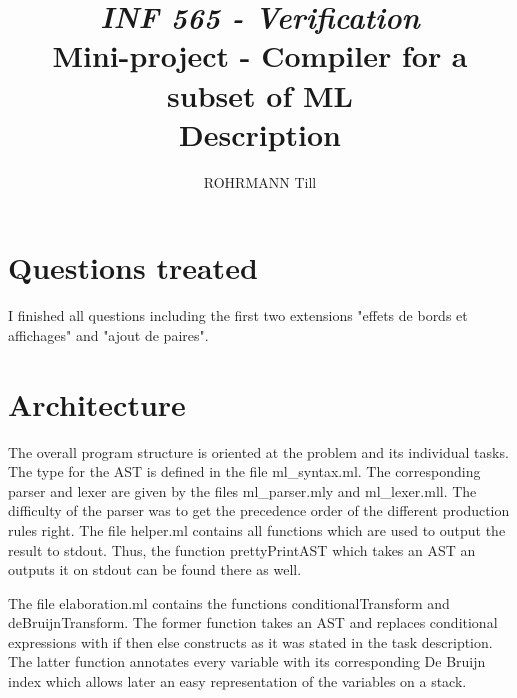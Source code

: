 \documentclass[a4paper, 12pt, titlepage]{article}
\title
{{\em INF 565 - Verification}\\
Mini-project - Compiler for a subset of ML\\
{\bf Description}}
\author{ROHRMANN Till}
\date{}
\begin{document}
\maketitle

\section{Questions treated}

I finished all questions including the first two extensions "effets de bords et affichages" and "ajout de paires".

\section{Architecture}

The overall program structure is oriented at the problem and its individual tasks. The type for the AST is defined in the file ml\_syntax.ml. The corresponding parser and lexer are given by the files ml\_parser.mly and ml\_lexer.mll. The difficulty of the parser was to get the precedence order of the different production rules right. The file helper.ml contains all functions which are used to output the result to stdout. Thus, the function prettyPrintAST which takes an AST an outputs it on stdout can be found there as well.

The file elaboration.ml contains the functions conditionalTransform and deBruijnTransform. The former function takes an AST and replaces conditional expressions with if then else constructs as it was stated in the task description. The latter function annotates every variable with its corresponding De Bruijn index which allows later an easy representation of the variables on a stack.
\end{document}
